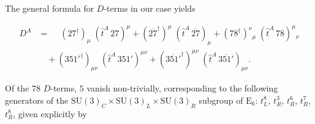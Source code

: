 \documentclass[a4paper,12pt]{article}
\def\SU{\mathrm{SU}}
\def\EE{\mathrm{E}_6}
\begin{document}
The general formula for $D$-terms in our case yields

\begin{align}
D^A&= \phantom{+}(27^\dagger)_\mu\;(\hat{t}^A\, 27)^\mu+(\overline{27}^\dagger)^\mu\;(\hat{t}^A\, \overline{27})_\mu+(78^\dagger)^{\nu}{}_{\mu}\;(\hat{t}^A\, 78)^{\mu}{}_{\nu}\nonumber\\
&\quad+(351'^\dagger)_{\mu\nu}\;(\hat{t}^A\, 351')^{\mu\nu}+(\overline{351'}^\dagger)^{\mu\nu}\;(\hat{t}^A\, \overline{351'})_{\mu\nu}.
\end{align}

Of the $78$ $D$-terms, $5$ vanish non-trivially, corresponding to the following generators of the $\SU(3)_C\times\SU(3)_L\times\SU(3)_R$ subgroup of $\EE$: $t_L^8$, $t_R^3$, $t_R^6$, $t_R^7$, $t_R^8$, given explicitly by
\end{document}

